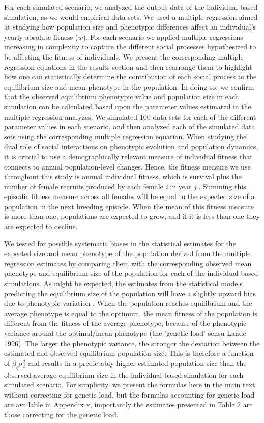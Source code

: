 \documentclass{article}
\begin{document}
For each simulated scenario, we analyzed the output data of the individual-based simulation, as we would empirical data sets. We used a multiple regression aimed at studying how population size and phenotypic differences affect an individual's yearly absolute fitness ($w$). For each scenario we applied multiple regressions increasing in complexity to capture the different social processes hypothesized to be affecting the fitness of individuals. We present the corresponding multiple regression equations in the results section and then rearrange them to highlight how one can statistically determine the contribution of each social process to the equilibrium size and mean phenotype in the population. In doing so, we confirm that the observed equilibrium phenotypic value and population size in each simulation can be calculated based upon the parameter values estimated in the multiple regression analyzes. We simulated 100 data sets for each of the different parameter values in each scenario, and then analyzed each of the simulated data sets using the corresponding multiple regression equation. When studying the dual role of social interactions on phenotypic evolution and population dynamics, it is crucial to use a demographically relevant measure of individual fitness that connects to annual population-level changes. Hence, the fitness measure we use throughout this study is annual individual fitness, which is survival plus the number of female recruits produced by each female \textit{i} in year \textit{j}  \citep{Saether2015}. Summing this episodic fitness measure across all females will be equal to the expected size of a population in the next breeding episode. When the mean of this fitness measure is more than one, populations are expected to grow, and if it is less than one they are expected to decline. 

We tested for possible systematic biases in the statistical estimates for the expected size and mean phenotype of the population derived from the multiple regression estimates by comparing them with the corresponding observed mean phenotype and equilibrium size of the population for each of the individual based simulations. As might be expected, the estimates from the statistical models predicting the equilibrium size of the population will have a slightly upward bias due to phenotypic variation \citep{Lande1996}. When the population reaches equilibrium and the average phenotype is equal to the optimum, the mean fitness of the population is different from the fitness of the average phenotype, because of the phenotypic variance around the optimal/mean phenotype (the 'genetic load' sensu Lande 1996). The larger the phenotypic variance, the stronger the deviation between the estimated and observed equilibrium population size. This is therefore a function of $\beta_q \sigma^2_z$ and results in a predictably higher estimated population size than the observed average equilibrium size in the individual based simulation for each simulated scenario. For simplicity, we present the formulas here in the main text without correcting for genetic load, but the formulas accounting for genetic load are available in Appendix x, importantly the estimates presented in Table 2 are those correcting for the genetic load.   
\end{document}
